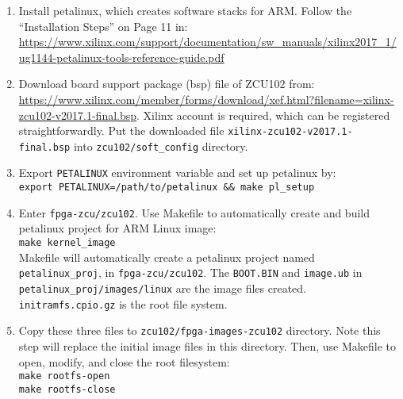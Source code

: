 \documentclass[a4paper,11pt]{article}
\begin{document}
\begin{enumerate}
\item Install petalinux, which creates software stacks for ARM. Follow the ``Installation Steps'' on Page 11 in: \url{https://www.xilinx.com/support/documentation/sw_manuals/xilinx2017_1/ug1144-petalinux-tools-reference-guide.pdf}

\item Download board support package (bsp) file of ZCU102 from: \url{https://www.xilinx.com/member/forms/download/xef.html?filename=xilinx-zcu102-v2017.1-final.bsp}. Xilinx account is required, which can be registered straightforwardly. Put  the downloaded file {\tt xilinx-zcu102-v2017.1-final.bsp} into {\tt zcu102/soft\_config} directory.

\item Export {\tt PETALINUX} environment variable and set up petalinux by:\\
{\tt export PETALINUX=/path/to/petalinux \&\& make pl\_setup}

\item Enter {\tt fpga-zcu/zcu102}. Use Makefile to automatically create and build petalinux project for ARM Linux image:\\
{\tt make kernel\_image}\\
Makefile will automatically create a petalinux project named {\tt petalinux\_proj}, in {\tt fpga-zcu/zcu102}.
The {\tt BOOT.BIN} and {\tt image.ub} in {\tt petalinux\_proj/images/linux} are the image files created. {\tt initramfs.cpio.gz} is the root file system.

\item Copy these three files to {\tt zcu102/fpga-images-zcu102} directory. Note this step will replace the initial image files in this directory. Then, use Makefile to open, modify, and close the root filesystem:\\
{\tt make rootfs-open}\\
{\tt make rootfs-close}
\end{enumerate}
\end{document}

